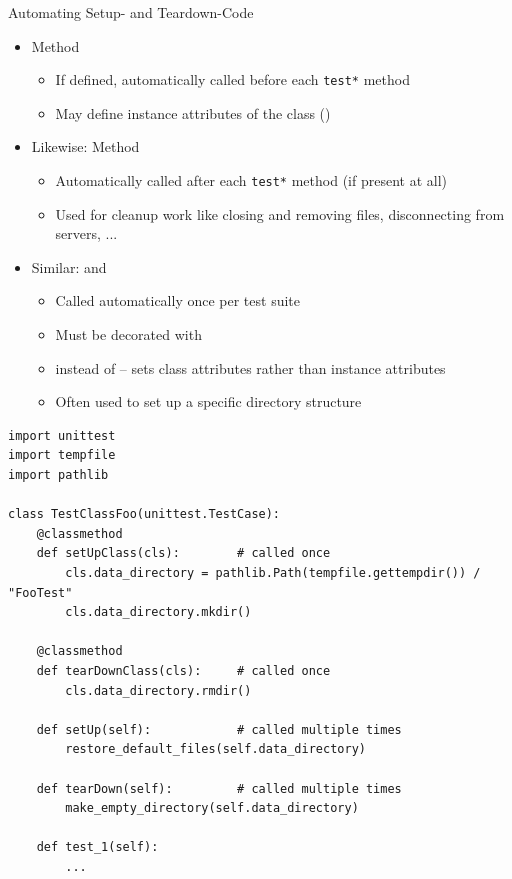 
\begin{frame}{Automating Setup- and Teardown-Code}
%
\begin{itemize}
\item Method 
	\begin{itemize}
	\item If defined, automatically called before each \texttt{test*} method
	\item May define instance attributes of the class ()
	\end{itemize}
\item Likewise: Method 
	\begin{itemize}
	\item Automatically called after each \texttt{test*} method (if present at all)
	\item Used for cleanup work like closing and removing files, disconnecting from servers, ...
	\end{itemize}
\pause
\item Similar:  and 
	\begin{itemize}
	\item Called automatically once per test suite
	\item Must be decorated with 
	\item {} instead of  -- sets class attributes rather than instance attributes
	\item Often used to set up a specific directory structure
	\end{itemize}
\end{itemize}
%
\end{frame}


\begin{frame}[fragile]
%
\vspace{-12pt}
\begin{codebox}[testFoo.py]
\begin{verbatim}
import unittest
import tempfile
import pathlib

class TestClassFoo(unittest.TestCase):
    @classmethod
    def setUpClass(cls):        # called once
        cls.data_directory = pathlib.Path(tempfile.gettempdir()) / "FooTest"
        cls.data_directory.mkdir()
    
    @classmethod
    def tearDownClass(cls):     # called once
        cls.data_directory.rmdir()
        
    def setUp(self):            # called multiple times
        restore_default_files(self.data_directory)
    
    def tearDown(self):         # called multiple times
        make_empty_directory(self.data_directory)
    
    def test_1(self):
        ...
\end{verbatim}
\end{codebox}
%
\end{frame}

